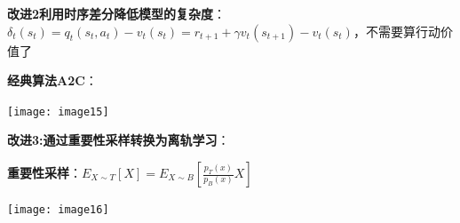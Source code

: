 	\textbf{改进2利用时序差分降低模型的复杂度}：$\delta_t\left(s_t\right)=q_t\left(s_t, a_t\right)-v_t\left(s_t\right)=r_{t+1}+\gamma v_t\left(s_{t+1}\right)-v_t\left(s_t\right)$，不需要算行动价值了
	
	\textbf{经典算法A2C}：
	
	\begin{figurehere}
		\centering
		\texttt{[image: image15]}
		\label{fig:image15}
	\end{figurehere}
	\textbf{改进3:通过重要性采样转换为离轨学习}：
	
	\textbf{重要性采样}：$E_{X\sim T}[X]=E_{X\sim B}\left[\frac{p_T(x)}{p_B(x)} X\right]$
	
	\begin{figurehere}
		\centering
		\texttt{[image: image16]}
		\label{fig:image16}
	\end{figurehere}
	
	
